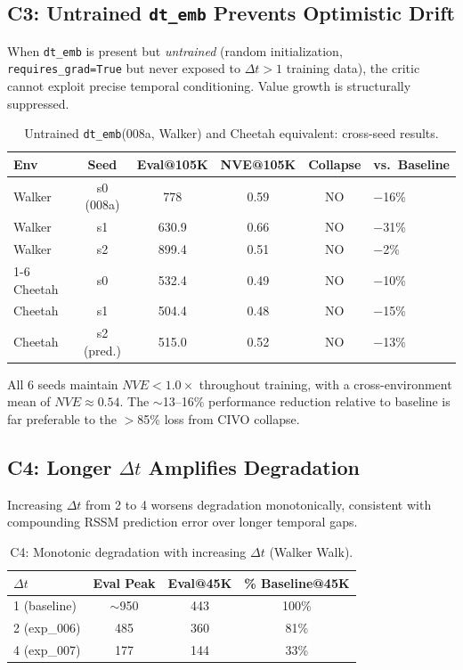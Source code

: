 \documentclass[letterpaper]{article}
\newcommand{\civo}{CIVO\xspace}
\newcommand{\nve}{NVE\xspace}
\newcommand{\dtemb}{\texttt{dt\_emb}\xspace}
\begin{document}
\subsection{C3: Untrained \dtemb Prevents Optimistic Drift}

When \dtemb is present but \emph{untrained} (random initialization, \texttt{requires\_grad=True} but never exposed to $\Delta t > 1$ training data), the critic cannot exploit precise temporal conditioning. Value growth is structurally suppressed.

\begin{table}[h]
\centering
\caption{Untrained \dtemb (008a, Walker) and Cheetah equivalent: cross-seed results.}
\label{tab:untrained_emb}
\begin{tabular}{lccccl}
\toprule
Env & Seed & Eval@105K & NVE@105K & Collapse & vs.\ Baseline \\
\midrule
Walker & s0 (008a) & 778 & 0.59 & NO & $-$16\% \\
Walker & s1 & 630.9 & 0.66 & NO & $-$31\% \\
Walker & s2 & 899.4 & 0.51 & NO & $-$2\% \\
\cmidrule(lr){1-6}
Cheetah & s0 & 532.4 & 0.49 & NO & $-$10\% \\
Cheetah & s1 & 504.4 & 0.48 & NO & $-$15\% \\
Cheetah & s2 (pred.) & 515.0 & 0.52 & NO & $-$13\% \\
\bottomrule
\end{tabular}
\end{table}

All 6 seeds maintain $\nve < 1.0\times$ throughout training, with a cross-environment mean of $\nve \approx 0.54$. The $\sim$13--16\% performance reduction relative to baseline is far preferable to the $>$85\% loss from \civo collapse.

\subsection{C4: Longer $\Delta t$ Amplifies Degradation}

Increasing $\Delta t$ from 2 to 4 worsens degradation monotonically, consistent with compounding RSSM prediction error over longer temporal gaps.

\begin{table}[h]
\centering
\caption{C4: Monotonic degradation with increasing $\Delta t$ (Walker Walk).}
\label{tab:c4_dt}
\begin{tabular}{lccc}
\toprule
$\Delta t$ & Eval Peak & Eval@45K & \% Baseline@45K \\
\midrule
1 (baseline) & $\sim$950 & 443 & 100\% \\
2 (exp\_006) & 485 & 360 & 81\% \\
4 (exp\_007) & 177 & 144 & 33\% \\
\bottomrule
\end{tabular}
\end{table}
\end{document}
